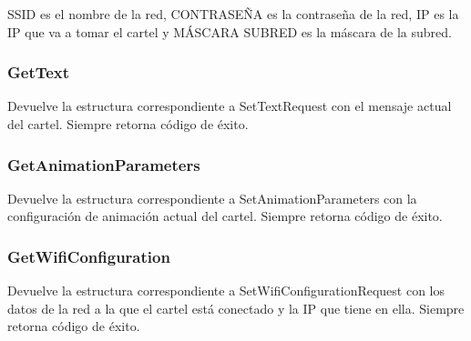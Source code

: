 SSID es el nombre de la red, CONTRASEÑA es la contraseña de la red, IP es la IP que va a tomar el cartel y MÁSCARA SUBRED es la máscara de la subred.

\subsubsection{GetText}
Devuelve la estructura correspondiente a SetTextRequest con el mensaje actual del cartel.
Siempre retorna código de éxito.

\subsubsection{GetAnimationParameters}
Devuelve la estructura correspondiente a SetAnimationParameters con la configuración de animación actual del cartel.
Siempre retorna código de éxito.

\subsubsection{GetWifiConfiguration}
Devuelve la estructura correspondiente a SetWifiConfigurationRequest con los datos de la red a la que el cartel está conectado y la IP que tiene en ella.
Siempre retorna código de éxito.

